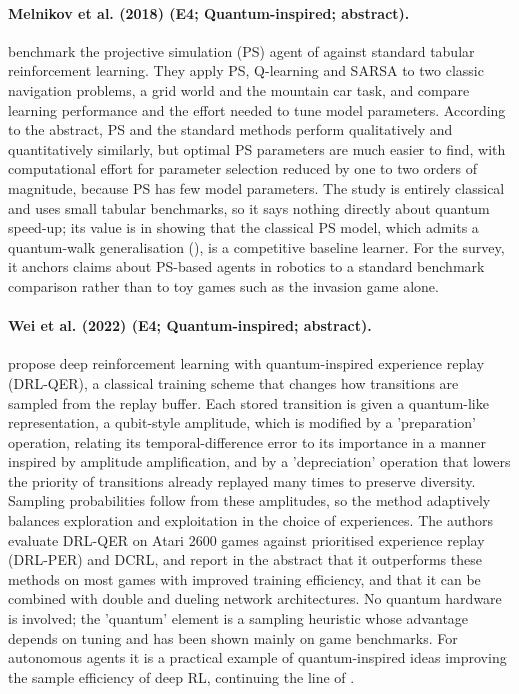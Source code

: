 \documentclass[10pt,a4paper]{article}
\begin{document}
\paragraph{Melnikov et al. (2018) (E4; Quantum-inspired; abstract).} \citet{Melnikov2018} benchmark the projective simulation (PS) agent of \citep{Briegel2012} against standard tabular reinforcement learning. They apply PS, Q-learning and SARSA to two classic navigation problems, a grid world and the mountain car task, and compare learning performance and the effort needed to tune model parameters. According to the abstract, PS and the standard methods perform qualitatively and quantitatively similarly, but optimal PS parameters are much easier to find, with computational effort for parameter selection reduced by one to two orders of magnitude, because PS has few model parameters. The study is entirely classical and uses small tabular benchmarks, so it says nothing directly about quantum speed-up; its value is in showing that the classical PS model, which admits a quantum-walk generalisation (\citep{Paparo2014}), is a competitive baseline learner. For the survey, it anchors claims about PS-based agents in robotics to a standard benchmark comparison rather than to toy games such as the invasion game alone.

\paragraph{Wei et al. (2022) (E4; Quantum-inspired; abstract).} \citet{Wei2022} propose deep reinforcement learning with quantum-inspired experience replay (DRL-QER), a classical training scheme that changes how transitions are sampled from the replay buffer. Each stored transition is given a quantum-like representation, a qubit-style amplitude, which is modified by a 'preparation' operation, relating its temporal-difference error to its importance in a manner inspired by amplitude amplification, and by a 'depreciation' operation that lowers the priority of transitions already replayed many times to preserve diversity. Sampling probabilities follow from these amplitudes, so the method adaptively balances exploration and exploitation in the choice of experiences. The authors evaluate DRL-QER on Atari 2600 games against prioritised experience replay (DRL-PER) and DCRL, and report in the abstract that it outperforms these methods on most games with improved training efficiency, and that it can be combined with double and dueling network architectures. No quantum hardware is involved; the 'quantum' element is a sampling heuristic whose advantage depends on tuning and has been shown mainly on game benchmarks. For autonomous agents it is a practical example of quantum-inspired ideas improving the sample efficiency of deep RL, continuing the line of \citep{Dong2008}.
\end{document}
